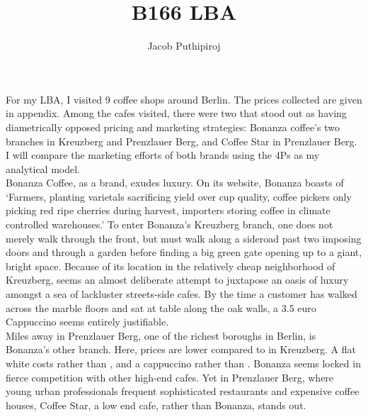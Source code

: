 \documentclass{article}
\begin{document}
\title{B166 LBA}
\author{Jacob Puthipiroj}
\date{}
\maketitle

For my LBA, I visited 9 coffee shops around Berlin. The prices collected are given in appendix. Among the cafes visited, there were two that stood out as having diametrically opposed pricing and marketing strategies: Bonanza coffee's two branches in Kreuzberg and Prenzlauer Berg, and Coffee Star in Prenzlauer Berg. I will compare the marketing efforts of both brands using the 4Ps as my analytical model.\\


Bonanza Coffee, as a brand, exudes luxury. On its website, Bonanza boasts of `Farmers, planting varietals sacrificing yield over cup quality, coffee pickers only picking red ripe cherries during harvest, importers storing coffee in climate controlled warehouses.' To enter Bonanza's Kreuzberg branch, one does not merely walk through the front, but must walk along a sideroad past two imposing doors and through a garden before finding a big green gate opening up to a giant, bright space. Because of its location in the relatively cheap neighborhood of Kreuzberg, seems an almost deliberate attempt to juxtapose an oasis of luxury amongst a sea of lackluster streets-side cafes. By the time a customer has walked across the marble floors and sat at table along the oak walls, a 3.5 euro Cappuccino seems entirely justifiable.\\

Miles away in Prenzlauer Berg, one of the richest boroughs in Berlin, is Bonanza's other branch. Here, prices are lower compared to in Kreuzberg. A flat white costs  rather than , and a cappuccino  rather than . Bonanza seems locked in fierce competition with other high-end cafes. Yet in Prenzlauer Berg, where young urban professionals frequent sophisticated restaurants and expensive coffee houses, Coffee Star, a low end cafe, rather than Bonanza, stands out.\\
\end{document}
